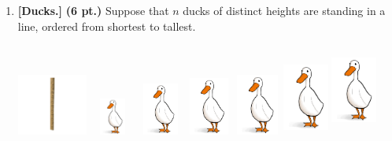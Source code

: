 \documentclass[11pt]{article}
\newcommand{\pts}[1]{\textbf{(#1 pt.)}}
\begin{document}
\begin{enumerate}
\newpage
\item \textbf{[Ducks.]} \pts{6}
Suppose that $n$ ducks of distinct heights are standing in a line, ordered from shortest to tallest. 
\begin{center}
\includegraphics[height=2cm]{yardstick}
\includegraphics[width=1.5cm,height=1.2cm]{duck}
\hspace{.1cm}
\includegraphics[width=1.5cm,height=1.7cm]{duck}
\hspace{.1cm}
\includegraphics[width=1.5cm,height=1.9cm]{duck}
\hspace{.1cm}
\includegraphics[width=1.5cm,height=2cm]{duck}
\hspace{.1cm}
\includegraphics[width=1.5cm,height=2.5cm]{duck}
\hspace{.1cm}
\includegraphics[width=1.5cm,height=3cm]{duck}
\end{center}


\end{enumerate}
\end{document}
